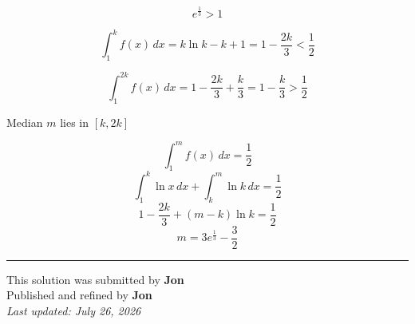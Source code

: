 \documentclass[12pt]{article}
\begin{document}
$$e^{\frac13}>1$$

$$\int_1^k f(x)\,dx=k\ln k-k+1=1-\frac{2k}{3}<\frac12$$

$$\int_1^{2k}f(x)\,dx=1-\frac{2k}{3}+\frac{k}{3}=1-\frac{k}{3}>\frac12$$

Median $m$ lies in $[k,2k]$

$$\int_1^m f(x)\,dx=\frac12$$
$$\int_1^k\ln x\,dx+\int_k^m\ln k\,dx=\frac12$$
$$1-\frac{2k}{3}+(m-k)\ln k=\frac12$$
$$m=3e^{\frac13}-\frac32$$

\bigskip
\hrule
\begin{center}
    This solution was submitted by \textbf{Jon}\\[4pt]
    Published and refined by \textbf{Jon}\\[8pt]
    \textit{Last updated: July 26, 2026}
\end{center}
\end{document}
